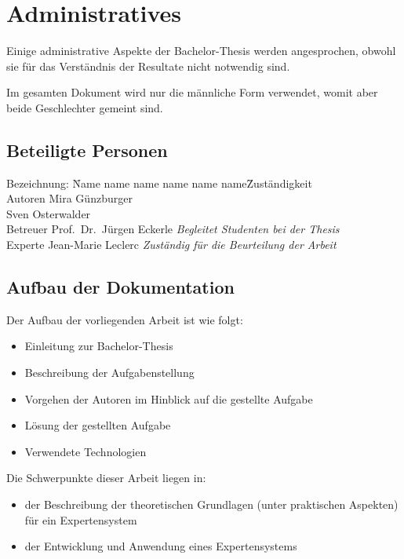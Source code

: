 \chapter{Administratives}
\label{chap:administratives}
Einige administrative Aspekte der Bachelor-Thesis werden angesprochen, obwohl sie für das Verständnis der Resultate nicht notwendig sind.

Im gesamten Dokument wird nur die männliche Form verwendet, womit aber beide Geschlechter gemeint sind.

\section{Beteiligte Personen}
\label{sec:admin_beteiligte}
\begin{tabbing} %
Bezeichnung: \= Name name name name name name\= Zuständigkeit \kill \\
    Autoren         \> Mira Günzburger\protect\footnotemark[1]{}    \> \\
                    \> Sven Osterwalder\protect\footnotemark[2]{} \> \\
    Betreuer        \> Prof.\ Dr.\ Jürgen Eckerle\protect\footnotemark[3]{}  \> \textit{Begleitet Studenten bei der Thesis}\\
    Experte         \> Jean-Marie Leclerc   \> \textit{Zuständig für die Beurteilung der Arbeit}
\end{tabbing}

\section{Aufbau der Dokumentation}
\label{sec:admin_aufbau}
Der Aufbau der vorliegenden Arbeit ist wie folgt:
\begin{itemize}
    \item Einleitung zur Bachelor-Thesis
    \item Beschreibung der Aufgabenstellung
    \item Vorgehen der Autoren im Hinblick auf die gestellte Aufgabe
    \item Lösung der gestellten Aufgabe
    \item Verwendete Technologien
\end{itemize}

Die Schwerpunkte dieser Arbeit liegen in:
\begin{itemize}
    \item der Beschreibung der theoretischen Grundlagen (unter praktischen Aspekten) für ein Expertensystem
    \item der Entwicklung und Anwendung eines Expertensystems
\end{itemize}

